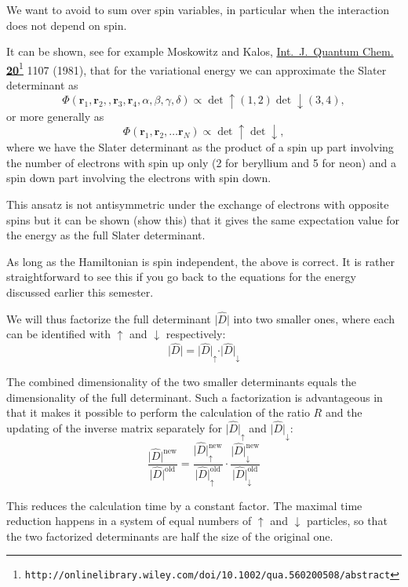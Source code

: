 \documentclass[graybox,sectrefs,envcountresetchap,open=right]{svmonodo}
\begin{document}
We want to avoid to sum over spin variables, in particular when the interaction does not depend on spin.

It can be shown, see for example Moskowitz and Kalos, \href{{http://onlinelibrary.wiley.com/doi/10.1002/qua.560200508/abstract}}{Int.~J.~Quantum Chem. \textbf{20}\footnote{\texttt{http://onlinelibrary.wiley.com/doi/10.1002/qua.560200508/abstract}} 1107 (1981)}, that for the variational energy
we can approximate the Slater determinant as  
\[
   \Phi(\mathbf{r}_1,\mathbf{r}_2,,\mathbf{r}_3,\mathbf{r}_4, \alpha,\beta,\gamma,\delta) \propto \det\uparrow(1,2)\det\downarrow(3,4),
\]
or more generally as 
\[
   \Phi(\mathbf{r}_1,\mathbf{r}_2,\dots \mathbf{r}_N) \propto \det\uparrow \det\downarrow,
\]
where we have the Slater determinant as the product of a spin up part involving the number of electrons with spin up only (2 for beryllium and 5 for neon) and a spin down part involving the electrons with spin down.

This ansatz is not antisymmetric under the exchange of electrons with  opposite spins but it can be shown (show this) that it gives the same
expectation value for the energy as the full Slater determinant.

As long as the Hamiltonian is spin independent, the above is correct. It is rather straightforward to see this if you go back to the equations for the energy discussed earlier  this semester.





We will thus
factorize the full determinant $\vert\hat{D}\vert$ into two smaller ones, where 
each can be identified with $\uparrow$ and $\downarrow$
respectively:
\[
\vert\hat{D}\vert = \vert\hat{D}\vert_\uparrow\cdot \vert\hat{D}\vert_\downarrow
\]




The combined dimensionality of the two smaller determinants equals the
dimensionality of the full determinant. Such a factorization is
advantageous in that it makes it possible to perform the calculation
of the ratio $R$ and the updating of the inverse matrix separately for
$\vert\hat{D}\vert_\uparrow$ and $\vert\hat{D}\vert_\downarrow$:
\[
\frac{\vert\hat{D}\vert^\mathrm{new}}{\vert\hat{D}\vert^\mathrm{old}} =
\frac{\vert\hat{D}\vert^\mathrm{new}_\uparrow}
{\vert\hat{D}\vert^\mathrm{old}_\uparrow}\cdot
\frac{\vert\hat{D}\vert^\mathrm{new}_\downarrow
}{\vert\hat{D}\vert^\mathrm{old}_\downarrow}
\]


This reduces the calculation time by a constant factor. The maximal
time reduction happens in a system of equal numbers of $\uparrow$ and
$\downarrow$ particles, so that the two factorized determinants are
half the size of the original one.
\end{document}
